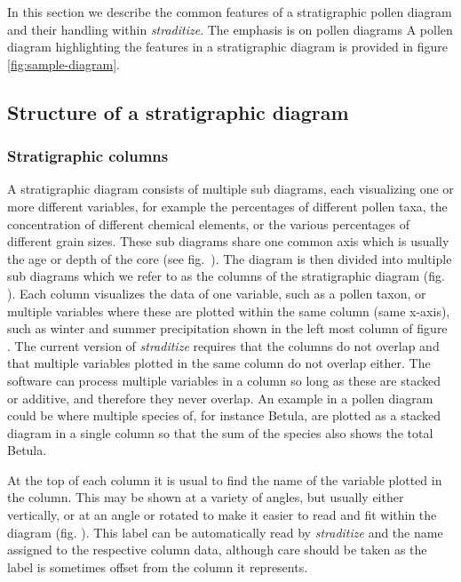 \begin{refsection}
In this section we describe the common features of a stratigraphic pollen diagram and their handling within \emph{straditize}. The emphasis is on pollen diagrams
A pollen diagram highlighting the features in a stratigraphic diagram is provided in figure
\ref{fig:sample-diagram}.

\subsection{Structure of a stratigraphic diagram}  \label{sec:straditize-structure}

\subsubsection{Stratigraphic columns}  \label{sec:straditize-strati-columns}
A stratigraphic diagram consists of multiple sub diagrams, each visualizing one or more different variables, for example the percentages of different pollen taxa, the concentration of different chemical elements, or the various percentages of different grain sizes. These sub diagrams share one common axis which is usually the age or depth of the core (see fig.~\samplediagram[a]). 
The diagram is then divided into multiple sub diagrams which we refer to as the columns of the stratigraphic diagram (fig. \samplediagram[b]). Each column visualizes the data of one variable, such as a pollen taxon, or multiple variables where these are plotted within the same column (same x-axis), such as winter and summer precipitation shown in the left most column of figure \samplediagram. The current version of \emph{straditize} requires that the columns do not overlap and that multiple variables plotted in the same column do not overlap either. The software can process multiple variables in a column so long as these are stacked or additive, and therefore they never overlap. An example in a pollen diagram could be where multiple species of, for instance Betula, are plotted as a stacked diagram in a single column so that the sum of the species also shows the total Betula.  

At the top of each column it is usual to find the name of the variable plotted in the column. This may be shown at a variety of angles, but usually either vertically, or at an angle or rotated to make it easier to read and fit within the diagram (fig. \samplediagram[c]). This label can be automatically read by \emph{straditize} and the name assigned to the respective column data, although care should be taken as the label is sometimes offset from the column it represents.  


\end{refsection}
